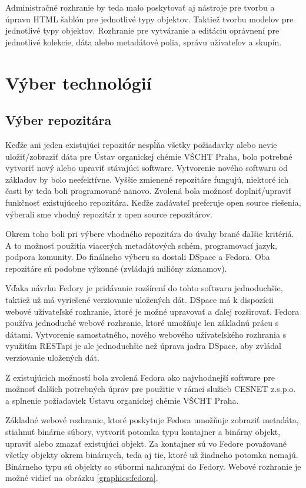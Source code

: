 \documentclass[thesis=M,slovak]{FITthesis}[2013/05/06]
\begin{document}
Administračné rozhranie by teda malo poskytovať aj nástroje pre tvorbu a úpravu HTML šablón pre jednotlivé typy objektov. Taktiež tvorbu modelov pre jednotlivé typy objektov.
Rozhranie pre vytváranie a editáciu oprávnení pre jednotlivé kolekcie, dáta alebo metadátové polia, správu užívateľov a skupín.


\section{Výber technológií}
\subsection{Výber repozitára}
Keďže ani jeden existujúci repozitár nespĺňa všetky požiadavky alebo nevie uložiť/zobraziť dáta pre Ústav organickej chémie VŠCHT Praha, bolo potrebné vytvoriť nový alebo upraviť stávajúci software. Vytvorenie nového softwaru od základov by bolo neefektívne. Vyššie zmienené repozitáre fungujú, niektoré ich časti by teda boli programované nanovo. Zvolená bola možnosť doplniť/upraviť funkčnosť existujúceho repozitára. Keďže zadávateľ preferuje open source riešenia, výberali sme vhodný repozitár z open source repozitárov.

Okrem toho boli pri výbere vhodného repozitára do úvahy brané ďalšie kritériá. A to možnosť použitia viacerých metadátových schém, programovací jazyk, podpora komunity. Do finálneho výberu sa dostali DSpace a Fedora. Oba repozitáre sú podobne výkonné (zvládajú milióny záznamov).

Vďaka návrhu Fedory je pridávanie rozšírení do tohto softwaru jednoduchšie, taktiež už má vyriešené verziovanie uložených dát. DSpace má k dispozícii webové užívateľské rozhranie, ktoré je možné upravovať a ďalej rozširovať. Fedora používa jednoduché webové rozhranie, ktoré umožňuje len základnú prácu s dátami. Vytvorenie samostatného, nového webového užívateľského rozhrania s využitím RESTapi je ale jednoduchšie než úprava jadra DSpace, aby zvládal verziovanie uložených dát.

Z existujúcich možností bola zvolená Fedora ako najvhodnejší software pre možnosť ďalších potrebných úprav pre použitie v rámci služieb CESNET z.s.p.o. a splnenie požiadaviek Ústavu organickej chémie VŠCHT Praha.

Základné webové rozhranie, ktoré poskytuje Fedora umožňuje zobraziť metadáta, stiahnuť binárne súbory, vytvoriť potomka typu kontajner a binárny objekt, upraviť alebo zmazať existujúci objekt. Za kontajner sú vo Fedore považované všetky objekty okrem binárnych, teda aj tie, ktoré už žiadneho potomka nemajú. Binárneho typu sú objekty so súbormi nahranými do Fedory. Webové rozhranie je možné vidieť na obrázku \ref{graphics:fedora}.
\end{document}
